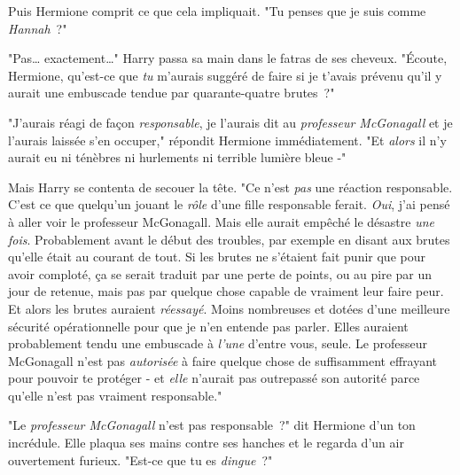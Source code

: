 Puis Hermione comprit ce que cela impliquait. "Tu penses que je suis comme \emph{Hannah}~?"

"Pas… exactement…" Harry passa sa main dans le fatras de ses cheveux. "Écoute, Hermione, qu'est-ce que \emph{tu} m'aurais suggéré de faire si je t'avais prévenu qu'il y aurait une embuscade tendue par quarante-quatre brutes~?"

"J'aurais réagi de façon \emph{responsable}, je l'aurais dit au \emph{professeur McGonagall} et je l'aurais laissée s'en occuper," répondit Hermione immédiatement. "Et \emph{alors} il n'y aurait eu ni ténèbres ni hurlements ni terrible lumière bleue -"

Mais Harry se contenta de secouer la tête. "Ce n'est \emph{pas} une réaction responsable. C'est ce que quelqu'un jouant le \emph{rôle} d'une fille responsable ferait. \emph{Oui}, j'ai pensé à aller voir le professeur McGonagall. Mais elle aurait empêché le désastre \emph{une fois}. Probablement avant le début des troubles, par exemple en disant aux brutes qu'elle était au courant de tout. Si les brutes ne s'étaient fait punir que pour avoir comploté, ça se serait traduit par une perte de points, ou au pire par un jour de retenue, mais pas par quelque chose capable de vraiment leur faire peur. Et alors les brutes auraient \emph{réessayé}. Moins nombreuses et dotées d'une meilleure sécurité opérationnelle pour que je n'en entende pas parler. Elles auraient probablement tendu une embuscade à \emph{l'une} d'entre vous, seule. Le professeur McGonagall n'est pas \emph{autorisée} à faire quelque chose de suffisamment effrayant pour pouvoir te protéger - et \emph{elle} n'aurait pas outrepassé son autorité parce qu'elle n'est pas vraiment responsable."

"Le \emph{professeur McGonagall} n'est pas responsable~?" dit Hermione d'un ton incrédule. Elle plaqua ses mains contre ses hanches et le regarda d'un air ouvertement furieux. "Est-ce que tu es \emph{dingue}~?"

